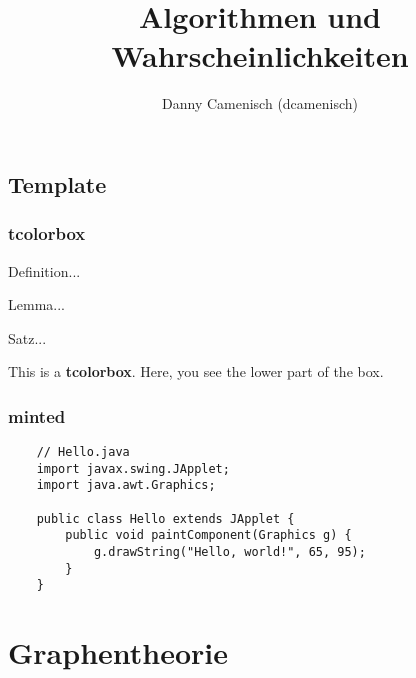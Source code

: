 \documentclass[a4paper]{report}
\title{Algorithmen und Wahrscheinlichkeiten}
\author{Danny Camenisch (dcamenisch)}
\begin{document}
\maketitle
\tableofcontents
\listofalgorithms



\chapter{Template}
\section{tcolorbox}

\begin{definition}
    Definition...
\end{definition}

\begin{lemma}
    Lemma...
\end{lemma}

\begin{satz}
    Satz...
\end{satz}

\begin{tcolorbox}[colback=dcWhite,colframe=dcOrange,title=\textbf{My Heading}]
    This is a \textbf{tcolorbox}.
\tcblower
    Here, you see the lower part of the box.

\end{tcolorbox}

\section{minted}

\begin{verbatim}
    // Hello.java
    import javax.swing.JApplet;
    import java.awt.Graphics;
    
    public class Hello extends JApplet {
        public void paintComponent(Graphics g) {
            g.drawString("Hello, world!", 65, 95);
        }    
    }
\end{verbatim}



\part{Graphentheorie}
\end{document}
